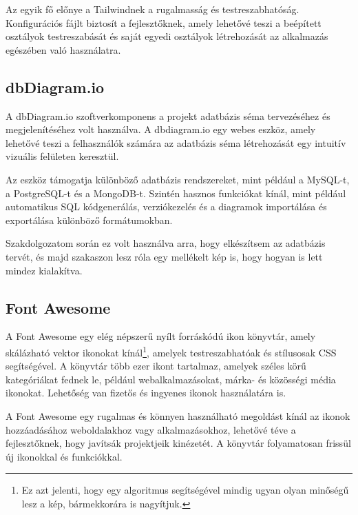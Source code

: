 \documentclass[
]{thesis-ekf}
\theoremstyle{definition}
\theoremstyle{remark}
\begin{document}
	Az egyik fő előnye a Tailwindnek a rugalmasság és testreszabhatóság. Konfigurációs fájlt biztosít a fejlesztőknek, amely lehetővé teszi a beépített osztályok testreszabását és saját egyedi osztályok létrehozását az alkalmazás egészében való használatra.
	\subsection{dbDiagram.io}
	A dbDiagram.io szoftverkomponens a projekt adatbázis séma tervezéséhez és megjelenítéséhez volt használva. A dbdiagram.io egy webes eszköz, amely lehetővé teszi a felhasználók számára az adatbázis séma létrehozását egy intuitív vizuális felületen keresztül. 
	
	Az eszköz támogatja különböző adatbázis rendszereket, mint például a MySQL-t, a PostgreSQL-t és a MongoDB-t. Szintén hasznos funkciókat kínál, mint például automatikus SQL kódgenerálás, verziókezelés és a diagramok importálása és exportálása különböző formátumokban.\cite{dbdiagram-io}
	
	Szakdolgozatom során ez volt használva arra, hogy elkészítsem az adatbázis tervét, és majd  szakaszon lesz róla egy mellékelt kép is, hogy hogyan is lett mindez kialakítva.
	
	\subsection{Font Awesome}
	
	A Font Awesome egy elég népszerű nyílt forráskódú ikon könyvtár, amely skálázható vektor ikonokat kínál\footnote{Ez azt jelenti, hogy egy algoritmus segítségével mindig ugyan olyan minőségű lesz a kép, bármekkorára is nagyítjuk.}, amelyek testreszabhatóak és stílusosak CSS segítségével. A könyvtár több ezer ikont tartalmaz, amelyek széles körű kategóriákat fednek le, például webalkalmazásokat, márka- és közösségi média ikonokat. Lehetőség van fizetős és ingyenes ikonok használatára is.
	
	A Font Awesome egy rugalmas és könnyen használható megoldást kínál az ikonok hozzáadásához weboldalakhoz vagy alkalmazásokhoz, lehetővé téve a fejlesztőknek, hogy javítsák projektjeik kinézetét. A könyvtár folyamatosan frissül új ikonokkal és funkciókkal.\cite{fontawesome}
	
\end{document}
